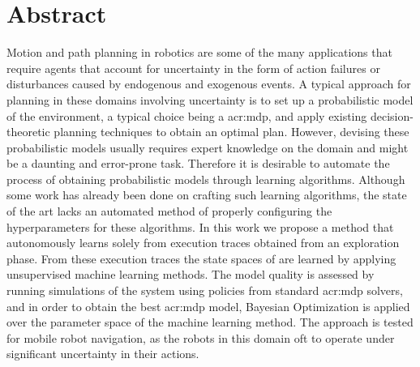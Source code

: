 \chapter*{Abstract}
\label{ch:abstract}

Motion and path planning in robotics are some of the many applications that require agents that account for uncertainty in the form of action failures or disturbances caused by endogenous and exogenous events.
A typical approach for planning in these domains involving uncertainty is to set up a probabilistic model of the environment, a typical choice being a \acrfull{acr:mdp}, and apply existing decision-theoretic planning techniques to obtain an optimal plan.
However, devising these probabilistic models usually requires expert knowledge on the domain and might be a daunting and error-prone task.
Therefore it is desirable to automate the process of obtaining probabilistic models through learning algorithms.
Although some work has already been done on crafting such learning algorithms, the state of the art lacks an automated method of properly configuring the hyperparameters for these algorithms.
In this work we propose a method that autonomously learns  solely from execution traces obtained from an exploration phase.
From these execution traces the state spaces of  are learned by applying unsupervised machine learning methods.
The model quality is assessed by running simulations of the system using policies from standard \acrshort{acr:mdp} solvers, and in order to obtain the best \acrshort{acr:mdp} model, Bayesian Optimization is applied over the parameter space of the machine learning method.
The approach is tested for mobile robot navigation, as the robots in this domain oft to operate under significant uncertainty in their actions.

%
%

